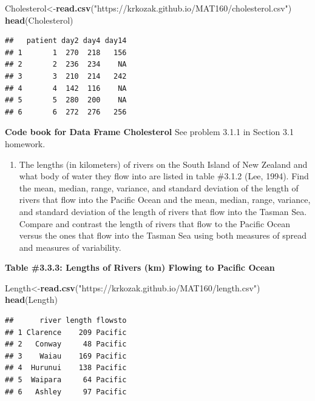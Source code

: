 \documentclass[
]{book}
\newenvironment{Shaded}{\begin{snugshade}}{\end{snugshade}}
\newcommand{\KeywordTok}[1]{\textcolor[rgb]{0.13,0.29,0.53}{\textbf{#1}}}
\newcommand{\NormalTok}[1]{#1}
\newcommand{\StringTok}[1]{\textcolor[rgb]{0.31,0.60,0.02}{#1}}
\providecommand{\tightlist}{%
  \setlength{\itemsep}{0pt}\setlength{\parskip}{0pt}}
\begin{document}
\begin{Shaded}
\begin{Highlighting}[]
\NormalTok{Cholesterol<-}\KeywordTok{read.csv}\NormalTok{(}\StringTok{"https://krkozak.github.io/MAT160/cholesterol.csv"}\NormalTok{)}
\KeywordTok{head}\NormalTok{(Cholesterol)}
\end{Highlighting}
\end{Shaded}

\begin{verbatim}
##   patient day2 day4 day14
## 1       1  270  218   156
## 2       2  236  234    NA
## 3       3  210  214   242
## 4       4  142  116    NA
## 5       5  280  200    NA
## 6       6  272  276   256
\end{verbatim}

\textbf{Code book for Data Frame Cholesterol} See problem 3.1.1 in Section 3.1 homework.

\begin{enumerate}
\def\labelenumi{\arabic{enumi}.}
\setcounter{enumi}{1}
\tightlist
\item
  The lengths (in kilometers) of rivers on the South Island of New Zealand and what body of water they flow into are listed in table \#3.1.2 (Lee, 1994). Find the mean, median, range, variance, and standard deviation of the length of rivers that flow into the Pacific Ocean and the mean, median, range, variance, and standard deviation of the length of rivers that flow into the Tasman Sea. Compare and contrast the length of rivers that flow to the Pacific Ocean versus the ones that flow into the Tasman Sea using both measures of spread and measures of variability.
\end{enumerate}

\textbf{Table \#3.3.3: Lengths of Rivers (km) Flowing to Pacific Ocean}

\begin{Shaded}
\begin{Highlighting}[]
\NormalTok{Length<-}\KeywordTok{read.csv}\NormalTok{(}\StringTok{"https://krkozak.github.io/MAT160/length.csv"}\NormalTok{)}
\KeywordTok{head}\NormalTok{(Length)}
\end{Highlighting}
\end{Shaded}

\begin{verbatim}
##      river length flowsto
## 1 Clarence    209 Pacific
## 2   Conway     48 Pacific
## 3    Waiau    169 Pacific
## 4  Hurunui    138 Pacific
## 5  Waipara     64 Pacific
## 6   Ashley     97 Pacific
\end{verbatim}
\end{document}
